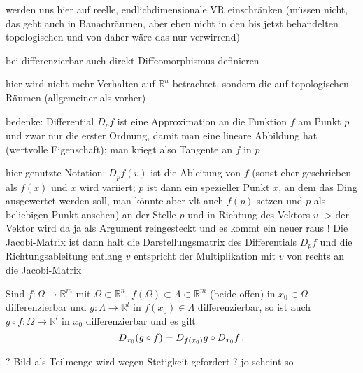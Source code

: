 \documentclass[../H_Analysis_main.tex]{subfiles}
\begin{document}
werden uns hier auf reelle, endlichdimensionale VR einschränken (müssen nicht, das geht auch in Banachräumen, aber eben nicht in den bis jetzt behandelten topologischen und von daher wäre das nur verwirrend)

bei differenzierbar auch direkt Diffeomorphismus definieren

hier wird nicht mehr Verhalten auf $\mathbb{R}^n$ betrachtet, sondern die auf topologischen Räumen (allgemeiner als vorher)

bedenke: Differential $D_p f$ ist eine Approximation an die Funktion $f$ am Punkt $p$ und zwar nur die erster Ordnung, damit man eine lineare Abbildung hat (wertvolle Eigenschaft); man kriegt also Tangente an $f$ in $p$

hier genutzte Notation: $D_p f(v)$ ist die Ableitung von $f$ (sonst eher geschrieben als $f(x)$ und $x$ wird variiert; $p$ ist dann ein spezieller Punkt $x$, an dem das Ding ausgewertet werden soll, man könnte aber vlt auch $f(p)$ setzen und $p$ als beliebigen Punkt ansehen) an der Stelle $p$ und in Richtung des Vektors $v$ -> der Vektor wird da ja als Argument reingesteckt und es kommt ein neuer raus ! Die Jacobi-Matrix ist dann halt die Darstellungsmatrix des Differentials $D_p f$ und die Richtungsableitung entlang $v$ entspricht der Multiplikation mit $v$ von rechts an die Jacobi-Matrix

\begin{satz}[Kettenregel]
Sind $f: \Omega \rightarrow \mathbb{R}^m$ mit $\Omega \subset \mathbb{R}^n, \, f(\Omega) \subset \Lambda \subset \mathbb{R}^m$ (beide offen) in $x_0 \in \Omega$ differenzierbar und $g: \Lambda \rightarrow \mathbb{R}^l$ in $f(x_0) \in \Lambda$ differenzierbar, so ist auch $g \circ f: \Omega \rightarrow \mathbb{R}^l$ in $x_0$ differenzierbar und es gilt
\begin{equation}
D_{x_0}\qty(g \circ f) = D_{f(x_0)} g \circ D_{x_0} f \, .
\end{equation}
\end{satz}
? Bild als Teilmenge wird wegen Stetigkeit gefordert ? jo scheint so
\end{document}
